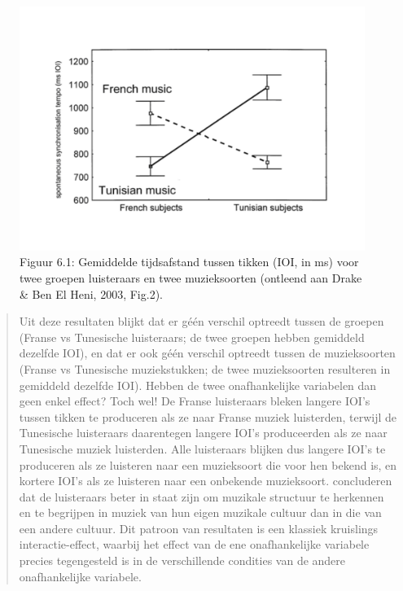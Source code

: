 \documentclass[
]{book}
\begin{document}
\begin{figure}
\hypertarget{fig:drakebenelheni2003fig2}{%
\centering
\includegraphics{figures/DrakeBenElHeni2003Fig2.png}
\caption{Figuur 6.1: Gemiddelde tijdsafstand tussen tikken (IOI, in ms) voor twee groepen
luisteraars en twee muzieksoorten (ontleend aan Drake \& Ben El Heni,
2003, Fig.2).}\label{fig:drakebenelheni2003fig2}
}
\end{figure}

\begin{quote}
Uit deze resultaten blijkt dat er géén verschil optreedt tussen de
groepen (Franse vs Tunesische luisteraars; de twee groepen hebben
gemiddeld dezelfde IOI), en dat er ook géén verschil optreedt tussen de
muzieksoorten (Franse vs Tunesische muziekstukken; de twee muzieksoorten
resulteren in gemiddeld dezelfde IOI). Hebben de twee onafhankelijke
variabelen dan geen enkel effect? Toch wel! De Franse luisteraars bleken
langere IOI's tussen tikken te produceren als ze naar Franse muziek
luisterden, terwijl de Tunesische luisteraars daarentegen langere IOI's
produceerden als ze naar Tunesische muziek luisterden. Alle luisteraars
blijken dus langere IOI's te produceren als ze luisteren naar een
muzieksoort die voor hen bekend is, en kortere IOI's als ze luisteren
naar een onbekende muzieksoort. concluderen dat de luisteraars beter in
staat zijn om muzikale structuur te herkennen en te begrijpen in muziek
van hun eigen muzikale cultuur dan in die van een andere cultuur. Dit
patroon van resultaten is een klassiek kruislings interactie-effect,
waarbij het effect van de ene onafhankelijke variabele precies
tegengesteld is in de verschillende condities van de andere
onafhankelijke variabele.
\end{quote}
\end{document}
